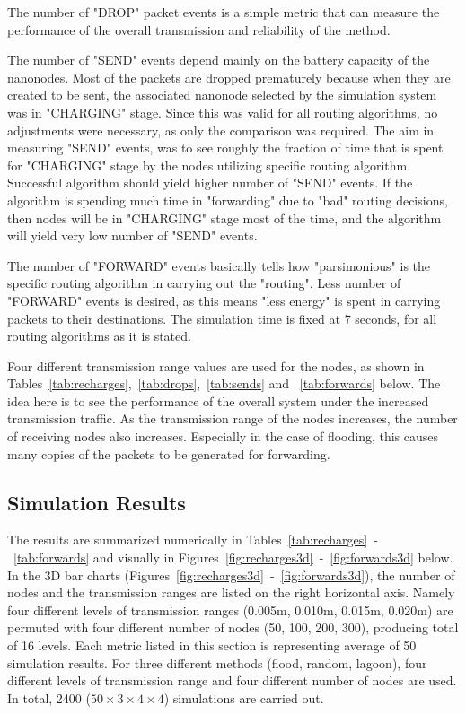 \documentclass[12pt, oneandhalf, chaparabic, sees, ms]{metu}
\begin{document}
The number of "DROP" packet events is a simple metric that can measure the performance of the overall transmission and reliability of the method.

The number of "SEND" events depend mainly on the battery capacity of the nanonodes. Most of the packets are dropped prematurely
because when they are created to be sent, the associated nanonode selected by the simulation system was in "CHARGING" stage. 
Since this was valid for all routing algorithms, 
no adjustments were necessary, as only the comparison was required.
The aim in measuring "SEND" events, was to see roughly the fraction of time that is spent for "CHARGING" stage by the nodes utilizing specific 
routing algorithm. Successful algorithm should yield higher number of "SEND" events. If the algorithm is spending much time in "forwarding" due to "bad" routing
decisions, then nodes will be in "CHARGING" stage most of the time, and the algorithm will yield very low number of "SEND" events.

The number of "FORWARD" events basically tells how "parsimonious" is the specific routing algorithm in carrying out the "routing". 
Less number of "FORWARD" events is desired, as this means "less energy" is spent in carrying packets to their destinations.
The simulation time is fixed at 7 seconds, for all routing algorithms as it is stated.

Four different transmission range values are used for the nodes, as shown in Tables~\ref{tab:recharges},~\ref{tab:drops},~\ref{tab:sends} and ~\ref{tab:forwards} below. 
The idea here is to see the performance of the overall system under the increased transmission traffic. As the transmission 
range of the nodes increases, the number of receiving nodes also increases. Especially in the case of flooding, this causes many copies of the packets to be generated for forwarding.


\newpage

\subsection{Simulation Results}\label{ssresults}
\vspace{-0.2cm}
The results are summarized numerically in Tables~\ref{tab:recharges}~-~\ref{tab:forwards} and 
visually in Figures~\ref{fig:recharges3d}~-~\ref{fig:forwards3d} below. 
In the 3D bar charts (Figures~\ref{fig:recharges3d}~-~\ref{fig:forwards3d}), the number of nodes and the transmission ranges are listed on the right horizontal axis.
Namely four different levels of transmission ranges (0.005m, 0.010m, 0.015m, 0.020m) are 
permuted with four different number of nodes (50, 100, 200, 300), producing total of 16 levels.
Each metric listed in this section is representing average of 50 simulation results.
For three different methods (flood, random, lagoon), four different levels of transmission range and four different number of nodes are used.
In total, 2400 ($50 \times 3 \times 4 \times 4$) simulations are carried out.
\end{document}
